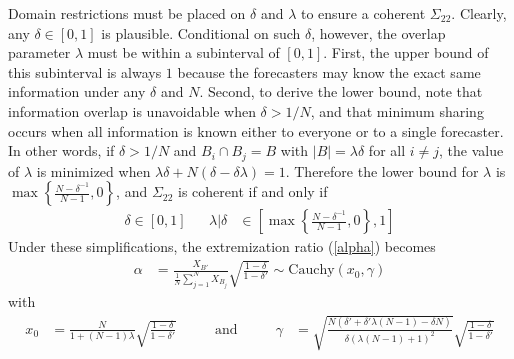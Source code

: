 \documentclass[11pt]{article}
\theoremstyle{definition}
\theoremstyle{definition}
\begin{document}
Domain restrictions must be placed on $\delta$ and $\lambda$ to ensure a coherent $\Sigma_{22}$. Clearly, any $\delta \in [0,1]$ is plausible. Conditional on such $\delta$, however, the overlap parameter $\lambda$ must be within a subinterval of $[0,1]$. First, the upper bound of this subinterval is always $1$ because the 
forecasters may know the exact same information under any $\delta$ and $N$. Second, to derive the lower bound, note that  
information overlap is unavoidable when $\delta > 1/N$, and that minimum
sharing occurs when all information is known either to everyone or
to a single forecaster.  In other words, if $\delta > 1/N$ and
$B_{i} \cap B_j = B$ with $|B| = \lambda \delta$ for all $i \neq j$,
the value of $\lambda$ is minimized when $\lambda\delta + N(\delta -
\delta\lambda) = 1$.  Therefore the lower bound for $\lambda$ is $\max
\left\{ \frac{N-\delta^{-1}}{N-1}, 0\right\}$, and $\Sigma_{22}$ is
coherent if and only if
\begin{align}
\delta \in [0,1] &&  \lambda | \delta &\in \left[  
   \max \left\{ \frac{N-\delta^{-1}}{N-1}, 0\right\}, 1 \right] 
   \label{rhoDomain}
\end{align}
Under these simplifications, the extremization ratio (\ref{alpha})
becomes
\begin{align*}
\alpha &= \frac{X_{B'}}{\frac{1}{N}\sum_{j=1}^N X_{B_j}} \sqrt{\frac{1-\delta}{1-\delta'}} \sim \text{Cauchy}(x_0, \gamma)
\end{align*}
 with
\begin{align*}
x_0 &= \frac{N}{1+(N-1)\lambda}  \sqrt{\frac{1-\delta}{1-\delta'}} &&& \text{ and } &&& \gamma &=  \sqrt{\frac{N(\delta' + \delta' \lambda (N-1) - \delta N)}{\delta (\lambda (N-1) + 1)^2}}\sqrt{\frac{1-\delta}{1-\delta'}}
\end{align*}
\end{document}
